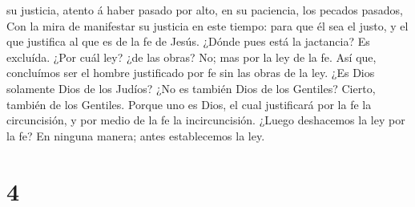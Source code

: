 su justicia, atento á haber pasado por alto, en su paciencia, los
pecados pasados,  Con la mira de manifestar su justicia en
este tiempo: para que él sea el justo, y el que justifica al que es de
la fe de Jesús.  ¿Dónde pues está la jactancia? Es
excluída. ¿Por cuál ley? ¿de las obras? No; mas por la ley de la fe.
 Así que, concluímos ser el hombre justificado por fe sin
las obras de la ley.  ¿Es Dios solamente Dios de los
Judíos? ¿No es también Dios de los Gentiles? Cierto, también de los
Gentiles.  Porque uno es Dios, el cual justificará por la
fe la circuncisión, y por medio de la fe la incircuncisión.
 ¿Luego deshacemos la ley por la fe? En ninguna manera;
antes establecemos la ley.

\hypertarget{section-3}{%
\section{4}\label{section-3}}

